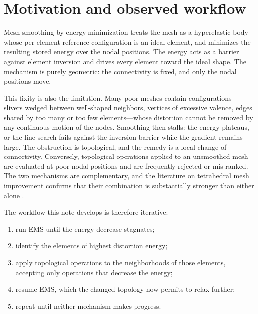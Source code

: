 \documentclass[11pt]{article}
\begin{document}
\tableofcontents

\section{Motivation and observed workflow}
\label{sec:motivation}

Mesh smoothing by energy minimization treats the mesh as a hyperelastic
body whose per-element reference configuration is an ideal element, and
minimizes the resulting stored energy over the nodal positions. The
energy acts as a barrier against element inversion and drives every
element toward the ideal shape. The mechanism is purely geometric: the
connectivity is fixed, and only the nodal positions move.

This fixity is also the limitation. Many poor meshes contain
configurations---slivers wedged between well-shaped neighbors, vertices
of excessive valence, edges shared by too many or too few
elements---whose distortion cannot be removed by any continuous motion of
the nodes. Smoothing then stalls: the energy plateaus, or the line search
fails against the inversion barrier while the gradient remains large. The
obstruction is topological, and the remedy is a local change of
connectivity. Conversely, topological operations applied to an unsmoothed
mesh are evaluated at poor nodal positions and are frequently rejected or
mis-ranked. The two mechanisms are complementary, and the literature on
tetrahedral mesh improvement confirms that their combination is
substantially stronger than either alone
\cite{freitag1997,klingner2007}.

The workflow this note develops is therefore iterative:
\begin{enumerate}[itemsep=2pt]
\item run EMS until the energy decrease stagnates;
\item identify the elements of highest distortion energy;
\item apply topological operations to the neighborhoods of those
  elements, accepting only operations that decrease the energy;
\item resume EMS, which the changed topology now permits to relax
  further;
\item repeat until neither mechanism makes progress.
\end{enumerate}
\end{document}
